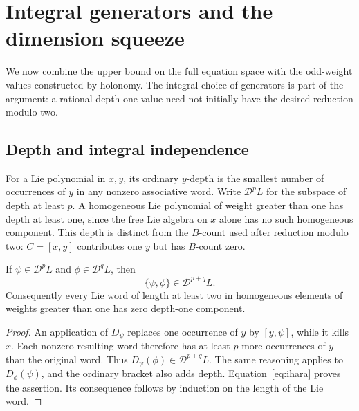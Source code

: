 \section{Integral generators and the dimension squeeze}
\label{sec:induction}

We now combine the upper bound on the full equation space with the
odd-weight values constructed by holonomy.  The integral choice of
generators is part of the argument: a rational depth-one value need
not initially have the desired reduction modulo two.

\subsection{Depth and integral independence}
For a Lie polynomial in \(x,y\), its ordinary \(y\)-depth is the
smallest number of occurrences of \(y\) in any nonzero associative
word.  Write \(\mathcal D^p L\) for the subspace of depth at least
\(p\).  A homogeneous Lie polynomial of weight greater than one
has depth at least one, since the free Lie algebra on \(x\) alone
has no such homogeneous component.
This depth is distinct from the \(B\)-count used after reduction
modulo two: \(C=[x,y]\) contributes one \(y\) but has \(B\)-count zero.

\begin{lemma}\label{lem:depth-addition}
If \(\psi\in\mathcal D^p L\) and
\(\phi\in\mathcal D^q L\), then
\[
 \{\psi,\phi\}\in\mathcal D^{p+q}L.
\]
Consequently every Lie word of length at least two in homogeneous
elements of weights greater than one has zero depth-one component.
\end{lemma}
\begin{proof}
An application of \(D_\psi\) replaces one occurrence of \(y\) by
\([y,\psi]\), while it kills \(x\).  Each nonzero resulting word
therefore has at least \(p\) more occurrences of \(y\) than the
original word.  Thus
\(D_\psi(\phi)\in\mathcal D^{p+q}L\).
The same reasoning applies to \(D_\phi(\psi)\), and the ordinary
bracket also adds depth.  Equation~\eqref{eq:ihara} proves the
assertion.  Its consequence follows by induction on the length of
the Lie word.
\end{proof}

